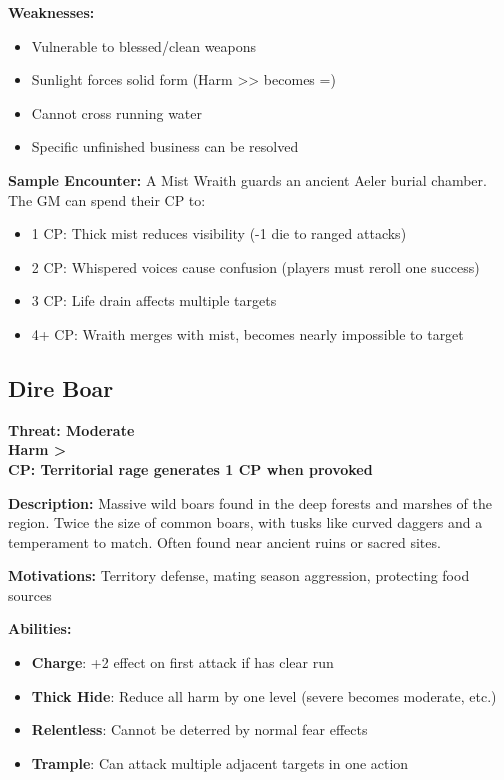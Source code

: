 \documentclass[12pt]{article}
\newcommand{\cp}[1]{\textbf{CP: #1}}
\newcommand{\harm}[1]{\textbf{Harm #1}}
\newcommand{\threat}[1]{\textbf{Threat: #1}}
\begin{document}
\textbf{Weaknesses:}
\begin{itemize}
\item Vulnerable to blessed/clean weapons
\item Sunlight forces solid form (Harm >> becomes =)
\item Cannot cross running water
\item Specific unfinished business can be resolved
\end{itemize}

\textbf{Sample Encounter:}
A Mist Wraith guards an ancient Aeler burial chamber. The GM can spend their CP to:
\begin{itemize}
\item 1 CP: Thick mist reduces visibility (-1 die to ranged attacks)
\item 2 CP: Whispered voices cause confusion (players must reroll one success)
\item 3 CP: Life drain affects multiple targets
\item 4+ CP: Wraith merges with mist, becomes nearly impossible to target
\end{itemize}

\subsection*{Dire Boar}

\threat{Moderate} \\
\harm{>} \\
\cp{Territorial rage generates 1 CP when provoked}

\vspace{0.5em}
\textbf{Description:} Massive wild boars found in the deep forests and marshes of the region. Twice the size of common boars, with tusks like curved daggers and a temperament to match. Often found near ancient ruins or sacred sites.

\textbf{Motivations:} Territory defense, mating season aggression, protecting food sources

\textbf{Abilities:}
\begin{itemize}
\item \textbf{Charge}: +2 effect on first attack if has clear run
\item \textbf{Thick Hide}: Reduce all harm by one level (severe becomes moderate, etc.)
\item \textbf{Relentless}: Cannot be deterred by normal fear effects
\item \textbf{Trample}: Can attack multiple adjacent targets in one action
\end{itemize}
\end{document}
